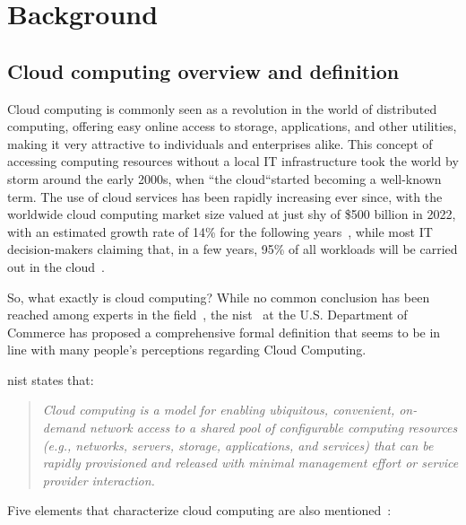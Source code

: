 \chapter{Background}\label{ch:background}

\section{Cloud computing overview and definition}

Cloud computing is commonly seen as a revolution in the world of distributed computing, offering easy online access to storage, applications, and other utilities, making it very attractive to individuals and enterprises alike. This concept of accessing computing resources without a local IT infrastructure took the world by storm around the early 2000s, when ``the cloud``started becoming a well-known term. The use of cloud services has been rapidly increasing ever since, with the worldwide cloud computing market size valued at just shy of \$500 billion in 2022, with an estimated growth rate of 14\% for the following years~\cite{gvr}, while most IT decision-makers claiming that, in a few years, 95\% of all workloads will be carried out in the cloud~\cite{logicmonitor}.

So, what exactly is cloud computing? While no common conclusion has been reached among experts in the field~\cite{cmany}, the \ac{nist}~\cite{nist} at the U.S. Department of Commerce has proposed a comprehensive formal definition that seems to be in line with many people's perceptions regarding Cloud Computing.

\ac{nist} states that: \blockquote{\textit{Cloud computing is a model for enabling ubiquitous, convenient, on-demand network access to a shared pool of configurable computing resources (e.g., networks, servers, storage, applications, and services) that can be rapidly provisioned and released with minimal management effort or service provider interaction.}}

Five elements that characterize cloud computing are also mentioned~\cite{nist,c2,cmany}:

